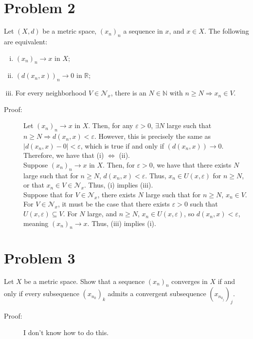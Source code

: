 \documentclass[8pt]{extarticle}
\newcommand{\N}{\mathbb{N}}
\newcommand{\R}{\mathbb{R}}
\begin{document}
  \section{Problem 2}%
  Let $(X,d)$ be a metric space, $(x_n)_n$ a sequence in $x$, and $x\in X$. The following are equivalent:
  \begin{enumerate}[(i)]
    \item $(x_n)_n \rightarrow x$ in $X$;
    \item $(d(x_n,x))_n\rightarrow 0$ in $\R$;
    \item For every neighborhood $V\in \mathcal{N}_x$, there is an $N\in \N$ with $n\geq N \Rightarrow x_n\in V$.
  \end{enumerate}
  \begin{description}
    \item[Proof:] Let $(x_n)_n\rightarrow x$ in $X$. Then, for any $\varepsilon > 0$, $\exists N$ large such that $n\geq N \Rightarrow d(x_n,x) < \varepsilon$. However, this is precisely the same as $|d(x_n,x) - 0| < \varepsilon$, which is true if and only if $(d(x_n,x))\rightarrow 0$. Therefore, we have that (i) $\Leftrightarrow$ (ii).\\

      Suppose $(x_n)_n \rightarrow x$ in $X$. Then, for $\varepsilon > 0$, we have that there exists $N$ large such that for $n\geq N$, $d(x_n,x) < \varepsilon$. Thus, $x_n\in U(x,\varepsilon)$ for $n\geq N$, or that $x_n\in V\in \mathcal{N}_x$. Thus, (i) implies (iii).\\

      Suppose that for $V\in \mathcal{N}_x$, there exists $N$ large such that for $n\geq N$, $x_n\in V$. For $V\in \mathcal{N}_x$, it must be the case that there exists $\varepsilon > 0$ such that $U(x,\varepsilon)\subseteq V$. For $N$ large, and $n\geq N$, $x_n\in U(x,\varepsilon)$, so $d(x_n,x) < \varepsilon$, meaning $(x_n)_n\rightarrow x$. Thus, (iii) implies (i).
  \end{description}
  \section{Problem 3}%
  Let $X$ be a metric space. Show that a sequence $(x_n)_n$ converges in $X$ if and only if every subsequence $\left(x_{n_k}\right)_k$ admits a convergent subsequence $\left(x_{n_{k_j}}\right)_j$.
  \begin{description}
    \item[Proof:] I don't know how to do this.
  \end{description}
\end{document}
